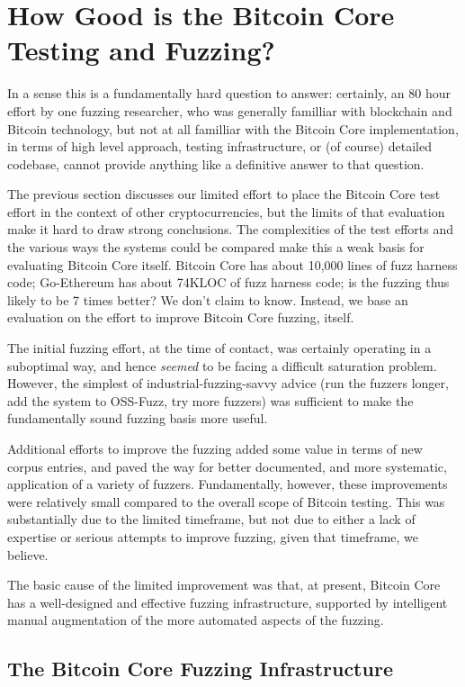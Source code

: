 \section{How Good is the Bitcoin Core Testing and Fuzzing?}

In a sense this is a fundamentally hard question to answer: certainly,
an 80 hour effort by one fuzzing researcher, who was generally
familliar with blockchain and Bitcoin technology, but not at all
familliar with the Bitcoin Core implementation, in terms of high level
approach, testing infrastructure, or (of course) detailed codebase,
cannot provide anything like a definitive answer to that question.

The previous section discusses our limited effort to place the Bitcoin
Core test effort in the context of other cryptocurrencies, but the
limits of that evaluation make it hard to draw strong conclusions.
The complexities of the test efforts and the various ways the systems
could be compared make this a weak basis for evaluating Bitcoin Core itself.
Bitcoin Core has about 10,000 lines of fuzz harness code; Go-Ethereum
has about 74KLOC of fuzz harness code; is the fuzzing thus likely to
be 7 times better?  We don't claim to know.  Instead, we base an
evaluation on the effort to improve Bitcoin Core fuzzing, itself.

The initial fuzzing effort, at the time of contact, was certainly
operating in a suboptimal way,
and hence \emph{seemed} to be facing a difficult saturation problem.
However, the simplest of industrial-fuzzing-savvy advice (run the fuzzers longer, add the system
to OSS-Fuzz, try more fuzzers) was sufficient to make the
fundamentally sound fuzzing basis more useful.

Additional efforts to improve the fuzzing added some value in terms of
new corpus entries, and paved
the way for better documented, and more systematic, application of a
variety of fuzzers.  Fundamentally, however, these improvements were
relatively small compared to the overall scope of Bitcoin testing.
This was substantially due to the limited timeframe, but not due to either a
lack of expertise or serious attempts to improve fuzzing, given that
timeframe, we believe.

The basic cause of the limited improvement was that, at present,
Bitcoin Core has a well-designed and effective fuzzing infrastructure,
supported by intelligent manual augmentation of the more automated
aspects of the fuzzing.

\subsection{The Bitcoin Core Fuzzing Infrastructure}

